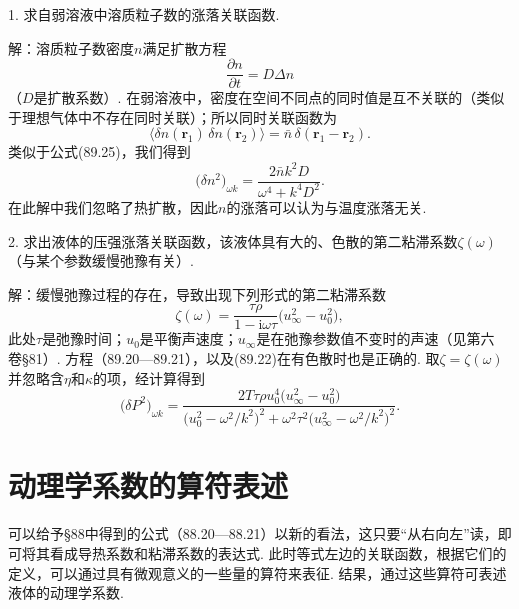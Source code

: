 \begin{xiti}

1. 求自弱溶液中溶质粒子数的涨落关联函数.

{\heiti 解：}溶质粒子数密度$n$满足扩散方程
\begin{equation*}
\frac{\partial n}{\partial t}=D\Delta n
\end{equation*}
（$D$是扩散系数）. 在弱溶液中，密度在空间不同点的同时值是互不关联的（类似于理想气体中不存在同时关联）；所以同时关联函数为
\begin{equation*}
\bigl\langle\delta n(\bm{r}_{1})\,\delta n(\bm{r}_{2})\bigr\rangle=\bar{n}\,\delta(\bm{r}_{1}-\bm{r}_{2}).
\end{equation*}
类似于公式(89.25)，我们得到
\begin{equation*}
\bigl(\delta n^{2}\bigr)_{\omega k}=\frac{2\bar{n}k^{2}D}{\omega^{4}+k^{4}D^{2}}.
\end{equation*}
在此解中我们忽略了热扩散，因此$n$的涨落可以认为与温度涨落无关.

2. 求出液体的压强涨落关联函数，该液体具有大的、色散的第二粘滞系数$\zeta(\omega)$（与某个参数缓慢弛豫有关）.

{\heiti 解：}缓慢弛豫过程的存在，导致出现下列形式的第二粘滞系数
\begin{equation*}
\zeta(\omega)=\frac{\tau\rho}{1-\mathrm{i}\omega\tau}\bigl(u^{2}_{\infty}-u^{2}_{0}\bigr),
\end{equation*}
此处$\tau$是弛豫时间；$u_{0}$是平衡声速度；$u_{\infty}$是在弛豫参数值不变时的声速（见第六
卷§81）. 方程（89.20—89.21），以及(89.22)在有色散时也是正确的. 取$\zeta=\zeta(\omega)$并忽略含$\eta$和$\kappa$的项，经计算得到
\begin{equation*}
\bigl(\delta P^{2}\bigr)_{\omega k}=\frac{2T\tau\rho u^{4}_{0}\bigl(u^{2}_{\infty}-u^{2}_{0}\bigr)}{\bigl(u^{2}_{0}-\omega^{2}/k^{2}\bigr)^{2}+\omega^{2}\tau^{2}\bigl(u^{2}_{\infty}-\omega^{2}/k^{2}\bigr)^{2}}.
\end{equation*}

\end{xiti}

\section{动理学系数的算符表述}

可以给予§88中得到的公式（88.20—88.21）以新的看法，这只要“从右向左”读，即可将其看成导热系数和粘滞系数的表达式. 此时等式左边的关联函数，根据它们的定义，可以通过具有微观意义的一些量的算符来表征. 结果，通过这些算符可表述液体的动理学系数.

